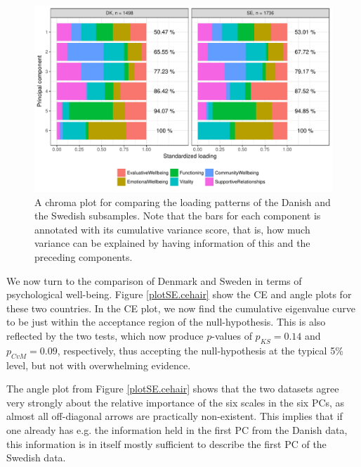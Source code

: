 \documentclass[titlepage,11pt,twoside]{article}
\newcommand{\hl}[1]{\textcolor{magenta}{#1}}
\begin{document}
\begin{figure}
\center
\includegraphics[scale = 0.7]{essDKSEpancake.pdf}
\caption{A chroma plot for comparing the loading patterns of the Danish and the Swedish subsamples. Note that the bars for each component is annotated with its cumulative variance score, that is, how much variance can be explained by having information of this and the preceding components.}
\label{plotSE.pancake}
\end{figure}


We now turn to the comparison of Denmark and Sweden in terms of psychological well-being. Figure \ref{plotSE.cehair} show the CE and angle plots for these two countries. In the CE plot, we now find the cumulative eigenvalue curve to be just within the acceptance region of the null-hypothesis. This is also reflected by the two tests, which now produce $p$-values of $p_{KS} = 0.14$ and $p_{CvM} = 0.09$, respectively, thus accepting the null-hypothesis at the typical 5\% level, but not with overwhelming evidence.

The angle plot from Figure \ref{plotSE.cehair} shows that the two datasets agree very strongly about the relative importance of the six scales in the six PCs, as almost all off-diagonal arrows are practically non-existent. This implies that if one already has e.g. the information held in the first PC from the Danish data, this information is in itself mostly sufficient to describe the first PC of the Swedish data.
\end{document}
